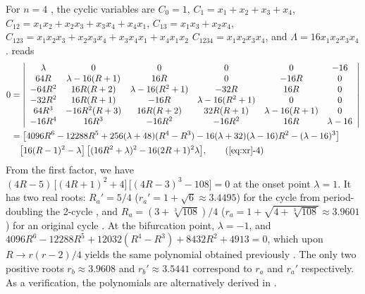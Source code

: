 \documentclass[preprint]{revtex4-1}
\begin{document}
For $n = 4$ \cite{stephenson}, the cyclic variables are
$C_0 = 1$,
$C_1 = x_1 + x_2 + x_3 + x_4$,
$C_{12} = x_1 x_2 + x_2 x_3 + x_3 x_4 + x_4 x_1$,
$C_{13} = x_1 x_3 + x_2 x_4$,
$C_{123} = x_1 x_2 x_3 + x_2 x_3 x_4 + x_3 x_4 x_1 + x_4 x_1 x_2$
$C_{1234} = x_1 x_2 x_3 x_4$,
and
$\Lambda = 16 x_1 x_2 x_3 x_4$.
%
 reads
%
\begin{align}
0 & = \left|
\begin{array}{cccccc}
 \lambda  & 0               & 0                 & 0     & 0     & -16 \\
 64 R     & \lambda-16(R+1) & 16 R              & 0     & -16R  & 0 \\
 -64 R^2  & 16R(R+2)        & \lambda-16(R^2+1) & -32 R & 16R   & 0 \\
 -32 R^2  & 16R(R+1)        & -16R              & \lambda-16(R^2+1)  & 0 & 0 \\
 64 R^3   & -16R^2(R+3)     & 16R(R+2)        & 32 R (R+1)       & \lambda-16(R+1) & 0 \\
 -16R^4   & 16R^3           & - 16R^2           & -16R^2            & 16R & \lambda - 16
\end{array}
\right | \nonumber  \\
& =
    \big[
    4096 R^6-12288 R^5 + 256 (\lambda + 48) (R^4- R^3)
      -16 (\lambda + 32)(\lambda - 16) R^2
      -(\lambda - 16)^3 \big]  \nonumber \\
& \quad
    \big[ 16 (R-1)^2 - \lambda \big]
 \, \big[(16 R^2 + \lambda)^2 - 16 (2R+1)^2 \lambda \big],
  \tag{\ref{eq:xr}-4}
\label{eq:xr4}
\end{align}
%
%
%
From the first factor, we have
$ (
    4R - 5
  )
\, \big[
  (4R + 1)^2 + 4
  \big]
\, \big[
  (4R - 3)^3 - 108
  \big] =0$
at the onset point $\lambda = 1$.
%
%
%
It has two real roots:
$R_a' = 5/4$
\big($r_a' = 1+\sqrt{6} \approx 3.4495$\big)
for the cycle from period-doubling the 2-cycle
  ,
and
$R_a = (3+\sqrt[3]{108})/4$
\big($r_a = 1+\sqrt{4+\sqrt[3]{108}} \approx 3.9601$\big)
for an original cycle .
%
At the bifurcation point, $\lambda = -1$, and
$4096 R^6 - 12288 R^5 + 12032 (R^4 - R^3)
  + 8432 R^2 + 4913 = 0$,
which upon $R \rightarrow r(r-2)/4$ yields the same polynomial
obtained previously
\cite{bailey1, kk1, bailey2, lewis}.
%
%
%
The only two positive roots $r_b \approx 3.9608$
and $r_b' \approx 3.5441$
correspond to $r_a$ and $r_a'$ respectively.
%
As a verification, the polynomials are
alternatively derived in .
\end{document}
